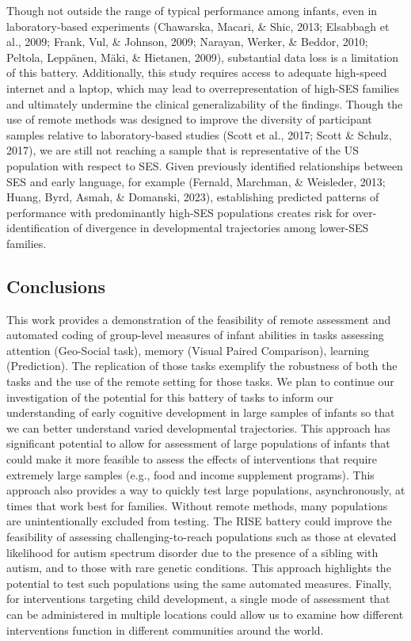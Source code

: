 \documentclass[
  english,
  man,floatsintext]{apa6}
\begin{document}
Though not outside the range of typical performance among infants, even in laboratory-based experiments (Chawarska, Macari, \& Shic, 2013; Elsabbagh et al., 2009; Frank, Vul, \& Johnson, 2009; Narayan, Werker, \& Beddor, 2010; Peltola, Leppänen, Mäki, \& Hietanen, 2009), substantial data loss is a limitation of this battery.
Additionally, this study requires access to adequate high-speed internet and a laptop, which may lead to overrepresentation of high-SES families and ultimately undermine the clinical generalizability of the findings.
Though the use of remote methods was designed to improve the diversity of participant samples relative to laboratory-based studies (Scott et al., 2017; Scott \& Schulz, 2017), we are still not reaching a sample that is representative of the US population with respect to SES.
Given previously identified relationships between SES and early language, for example (Fernald, Marchman, \& Weisleder, 2013; Huang, Byrd, Asmah, \& Domanski, 2023), establishing predicted patterns of performance with predominantly high-SES populations creates risk for over-identification of divergence in developmental trajectories among lower-SES families.

\subsection{Conclusions}\label{conclusions}

This work provides a demonstration of the feasibility of remote assessment and automated coding of group-level measures of infant abilities in tasks assessing attention (Geo-Social task), memory (Visual Paired Comparison), learning (Prediction).
The replication of those tasks exemplify the robustness of both the tasks and the use of the remote setting for those tasks.
We plan to continue our investigation of the potential for this battery of tasks to inform our understanding of early cognitive development in large samples of infants so that we can better understand varied developmental trajectories.
This approach has significant potential to allow for assessment of large populations of infants that could make it more feasible to assess the effects of interventions that require extremely large samples (e.g., food and income supplement programs).
This approach also provides a way to quickly test large populations, asynchronously, at times that work best for families.
Without remote methods, many populations are unintentionally excluded from testing.
The RISE battery could improve the feasibility of assessing challenging-to-reach populations such as those at elevated likelihood for autism spectrum disorder due to the presence of a sibling with autism, and to those with rare genetic conditions.
This approach highlights the potential to test such populations using the same automated measures.
Finally, for interventions targeting child development, a single mode of assessment that can be administered in multiple locations could allow us to examine how different interventions function in different communities around the world.
\end{document}
